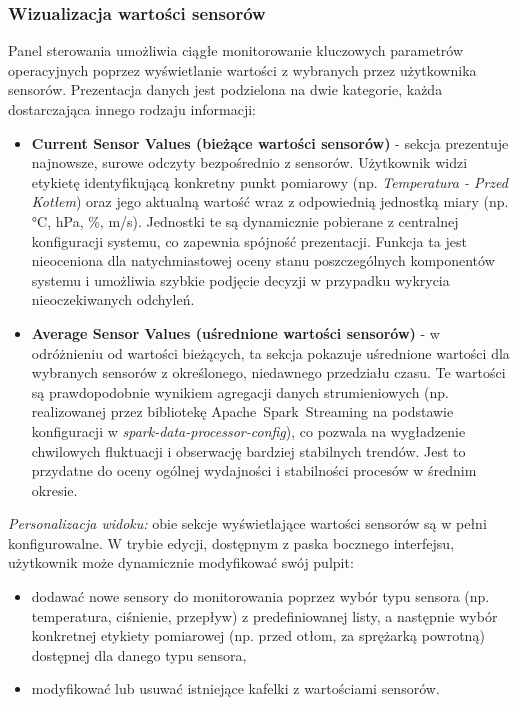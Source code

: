 \subsubsection{Wizualizacja wartości sensorów}
Panel sterowania umożliwia ciągłe monitorowanie kluczowych parametrów operacyjnych poprzez wyświetlanie wartości z wybranych przez użytkownika sensorów. Prezentacja danych jest podzielona na dwie kategorie, każda dostarczająca innego rodzaju informacji:
\vspace{0.3em}
\begin{itemize}
    \item \textbf{Current Sensor Values (bieżące wartości sensorów)} - sekcja prezentuje najnowsze, surowe odczyty bezpośrednio z sensorów. Użytkownik widzi etykietę identyfikującą konkretny punkt pomiarowy (np. \textit{Temperatura - Przed Kotłem}) oraz jego aktualną wartość wraz z odpowiednią jednostką miary (np. °C, hPa, \%, m/s). Jednostki te są dynamicznie pobierane z centralnej konfiguracji systemu, co zapewnia spójność prezentacji. Funkcja ta jest nieoceniona dla natychmiastowej oceny stanu poszczególnych komponentów systemu i umożliwia szybkie podjęcie decyzji w przypadku wykrycia nieoczekiwanych odchyleń.
    \item \textbf{Average Sensor Values (uśrednione wartości sensorów)} - w odróżnieniu od wartości bieżących, ta sekcja pokazuje uśrednione wartości dla wybranych sensorów z określonego, niedawnego przedziału czasu. Te wartości są prawdopodobnie wynikiem agregacji danych strumieniowych (np. realizowanej przez bibliotekę \mbox{Apache Spark Streaming} na podstawie konfiguracji w \textit{spark-data-processor-config}), co pozwala na wygładzenie chwilowych fluktuacji i obserwację bardziej stabilnych trendów. Jest to przydatne do oceny ogólnej wydajności i stabilności procesów w średnim okresie.
\end{itemize}
\vspace{0.3em}
\textit{Personalizacja widoku:} obie sekcje wyświetlające wartości sensorów są w pełni konfigurowalne. W trybie edycji, dostępnym z paska bocznego interfejsu, użytkownik może dynamicznie modyfikować swój pulpit:
\vspace{0.3em}
\begin{itemize}
    \item dodawać nowe sensory do monitorowania poprzez wybór typu sensora (np. temperatura, ciśnienie, przepływ) z predefiniowanej listy, a następnie wybór konkretnej etykiety pomiarowej (np. przed otłom, za sprężarką powrotną) dostępnej dla danego typu sensora,
    \item modyfikować lub usuwać istniejące kafelki z wartościami sensorów.
\end{itemize}
